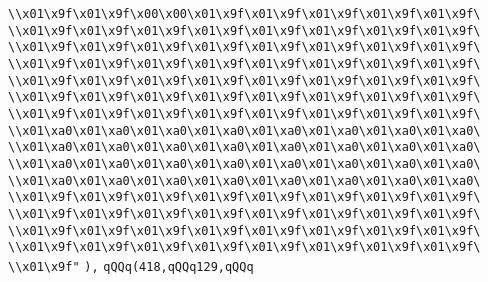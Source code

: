 \verb|\\x01\x9f\x01\x9f\x00\x00\x01\x9f\x01\x9f\x01\x9f\x01\x9f\x01\x9f\|\newline
\verb|\\x01\x9f\x01\x9f\x01\x9f\x01\x9f\x01\x9f\x01\x9f\x01\x9f\x01\x9f\|\newline
\verb|\\x01\x9f\x01\x9f\x01\x9f\x01\x9f\x01\x9f\x01\x9f\x01\x9f\x01\x9f\|\newline
\verb|\\x01\x9f\x01\x9f\x01\x9f\x01\x9f\x01\x9f\x01\x9f\x01\x9f\x01\x9f\|\newline
\verb|\\x01\x9f\x01\x9f\x01\x9f\x01\x9f\x01\x9f\x01\x9f\x01\x9f\x01\x9f\|\newline
\verb|\\x01\x9f\x01\x9f\x01\x9f\x01\x9f\x01\x9f\x01\x9f\x01\x9f\x01\x9f\|\newline
\verb|\\x01\x9f\x01\x9f\x01\x9f\x01\x9f\x01\x9f\x01\x9f\x01\x9f\x01\x9f\|\newline
\verb|\\x01\xa0\x01\xa0\x01\xa0\x01\xa0\x01\xa0\x01\xa0\x01\xa0\x01\xa0\|\newline
\verb|\\x01\xa0\x01\xa0\x01\xa0\x01\xa0\x01\xa0\x01\xa0\x01\xa0\x01\xa0\|\newline
\verb|\\x01\xa0\x01\xa0\x01\xa0\x01\xa0\x01\xa0\x01\xa0\x01\xa0\x01\xa0\|\newline
\verb|\\x01\xa0\x01\xa0\x01\xa0\x01\xa0\x01\xa0\x01\xa0\x01\xa0\x01\xa0\|\newline
\verb|\\x01\x9f\x01\x9f\x01\x9f\x01\x9f\x01\x9f\x01\x9f\x01\x9f\x01\x9f\|\newline
\verb|\\x01\x9f\x01\x9f\x01\x9f\x01\x9f\x01\x9f\x01\x9f\x01\x9f\x01\x9f\|\newline
\verb|\\x01\x9f\x01\x9f\x01\x9f\x01\x9f\x01\x9f\x01\x9f\x01\x9f\x01\x9f\|\newline
\verb|\\x01\x9f\x01\x9f\x01\x9f\x01\x9f\x01\x9f\x01\x9f\x01\x9f\x01\x9f\|\newline
\verb|\\x01\x9f"|\newline
\verb|),|\newline
\verb|qQQq(418,qQQq129,qQQq|\newline
